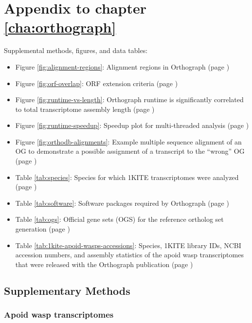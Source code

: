 \chapter{Appendix to chapter \ref{cha:orthograph}}

\ifdraft{%
}%
{%
}%

Supplemental methods, figures, and data tables:

\begin{itemize}
	\item Figure \ref{fig:alignment-regions}: Alignment regions in Orthograph (page \pageref{fig:alignment-regions})
	\item Figure \ref{fig:orf-overlap}: ORF extension criteria (page \pageref{fig:orf-overlap})
	\item Figure \ref{fig:runtime-vs-length}: Orthograph runtime is significantly correlated to total transcriptome assembly length (page \pageref{fig:runtime-vs-length})
	\item Figure \ref{fig:runtime-speedup}: Speedup plot for multi-threaded analysis (page \pageref{fig:runtime-speedup})
	\item Figure \ref{fig:orthodb-alignments}: Example multiple sequence alignment of an OG to demonstrate a possible assignment of a transcript to the ``wrong'' OG (page \pageref{fig:orthodb-alignments})
\end{itemize}

\begin{itemize}
	\item Table \ref{tab:species}: Species for which 1KITE transcriptomes were analyzed (page \pageref{tab:species})
	\item Table \ref{tab:software}: Software packages required by Orthograph (page \pageref{tab:software})
	\item Table \ref{tab:ogs}: Official gene sets (OGS) for the reference ortholog set generation (page \pageref{tab:ogs})
	\item Table \ref{tab:1kite-apoid-wasps-accessions}: Species, 1KITE library IDs, NCBI accession numbers, and assembly statistics of the apoid 
wasp transcriptomes that were released with the Orthograph publication (page \pageref{tab:1kite-apoid-wasps-accessions})
\end{itemize}

\section{Supplementary Methods}

\subsection{Apoid wasp transcriptomes}

